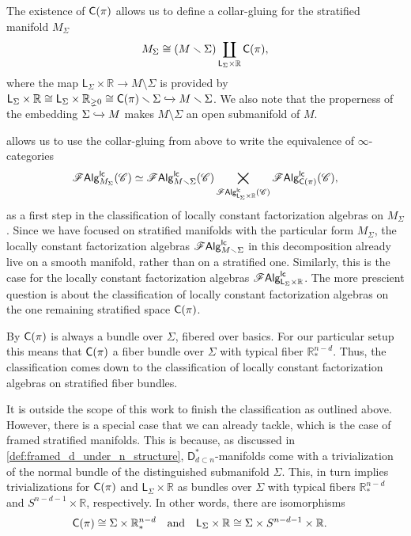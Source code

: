 \documentclass[../text]{subfiles}
\begin{document}
\begin{construction}
    The existence of $\cone(\pi)$ allows us to define a collar-gluing for the stratified manifold $M_\Sigma$
    \begin{equation}\label{eq:M_Sigma_decomposition}
        M_\Sigma \cong \left( M \setminus \Sigma \right) \coprod_{\mathsf{L}_\Sigma \times \mathbb{R}} \cone(\pi),
    \end{equation}
    where the map $\mathsf{L}_\Sigma \times \mathbb{R} \rightarrow M \setminus \Sigma$ is provided by $\mathsf{L}_\Sigma \times \mathbb{R} \cong \mathsf{L}_\Sigma \times \mathbb{R}_{\gneq 0} \cong \cone(\pi) \setminus \Sigma \xhookrightarrow{} M \setminus \Sigma$. We also note that the properness of the embedding $\Sigma \xhookrightarrow{} M$ makes $M \setminus \Sigma$ an open submanifold of $M$.
\end{construction}


 allows us to use the collar-gluing from above to write the equivalence of $\infty$-categories
%
\begin{equation}
    \lcfa_{M_\Sigma} (\catC) \simeq \lcfa_{M \setminus \Sigma} (\catC) \bigtimes_{\lcfa_{\mathsf{L}_\Sigma \times \mathbb{R}} (\catC)} \lcfa_{\cone(\pi)} (\catC),
\end{equation}
%
as a first step in the classification of locally constant factorization algebras on $M_{\Sigma}$. Since we have focused on stratified manifolds with the particular form $M_{\Sigma}$, the locally constant factorization algebras $\mathscr{F} \mathsf{Alg}^{\mathsf{lc}}_{M \smallsetminus \Sigma}$ in this decomposition already live on a smooth manifold, rather than on a stratified one. Similarly, this is the case for the locally constant factorization algebras $\mathscr{F} \mathsf{Alg}^{\mathsf{lc}}_{\mathsf{L}_\Sigma \times \mathbb{R}}$. The more prescient question is about the classification of locally constant factorization algebras on the one remaining stratified space $\cone(\pi)$. 

By \cite[ex.3.6.6]{aft_localstrut} $\cone(\pi)$ is always a bundle over $\Sigma$, fibered over basics. For our particular setup this means that $\cone(\pi)$ a fiber bundle over $\Sigma$ with typical fiber $\mathbb{R}^{n-d}_*$. Thus, the classification comes down to the classification of locally constant factorization algebras on stratified fiber bundles.

It is outside the scope of this work to finish the classification as outlined above. However, there is a special case that we can already tackle, which is the case of framed stratified manifolds. This is because, as discussed in \cref{def:framed_d_under_n_structure}, $\mathsf{D}_{d \subset n}^*$-manifolds come with a trivialization of the normal bundle of the distinguished submanifold $\Sigma$. This, in turn implies trivializations for $\cone(\pi)$ and $\mathsf{L}_{\Sigma} \times \mathbb{R}$ as bundles over $\Sigma$ with typical fibers $\mathbb{R}^{n-d}_*$ and $S^{n-d-1} \times \mathbb{R}$, respectively. In other words, there are isomorphisms
%
\begin{align}
    &\cone(\pi) \cong \Sigma \times \mathbb{R}^{n-d}_*& &\mathrm{and}& &\mathsf{L}_{\Sigma} \times \mathbb{R} \cong \Sigma \times S^{n-d-1} \times \mathbb{R}.&
\end{align}
\end{document}
